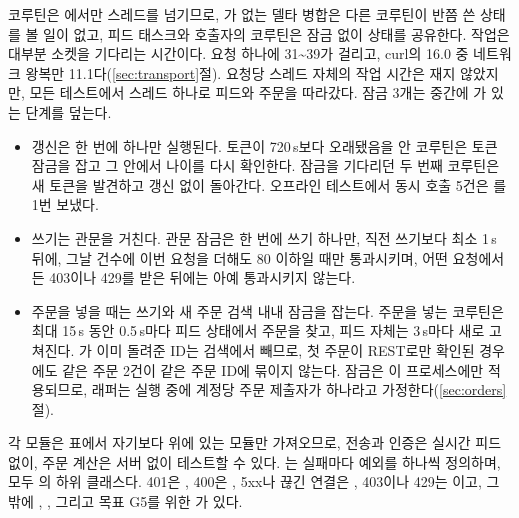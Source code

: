 

 코루틴은 에서만 스레드를 넘기므로, 가 없는 델타 병합은 다른 코루틴이 반쯤 쓴 상태를 볼 일이 없고, 피드 태스크와 호출자의 코루틴은 잠금 없이 상태를 공유한다. 작업은 대부분 소켓을 기다리는 시간이다. 요청 하나에 31\textasciitilde 39\ms{}가 걸리고, curl의 16.0\ms{} 중 네트워크 왕복만 11.1\ms{}다(\ref{sec:transport}절). 요청당 스레드 자체의 작업 시간은 재지 않았지만, 모든 테스트에서 스레드 하나로 피드와 주문을 따라갔다. 잠금 3개는 중간에 가 있는 단계를 덮는다.
\begin{itemize}
\item 갱신은 한 번에 하나만 실행된다. 토큰이 720\,s보다 오래됐음을 안 코루틴은 토큰 잠금을 잡고 그 안에서 나이를 다시 확인한다. 잠금을 기다리던 두 번째 코루틴은 새 토큰을 발견하고 갱신 없이 돌아간다. 오프라인 테스트에서 동시  호출 5건은 를 1번 보냈다.
\item 쓰기는 관문을 거친다. 관문 잠금은 한 번에 쓰기 하나만, 직전 쓰기보다 최소 1\,s 뒤에, 그날 건수에 이번 요청을 더해도 80 이하일 때만 통과시키며, 어떤 요청에서든 403이나 429를 받은 뒤에는 아예 통과시키지 않는다.
\item 주문을 넣을 때는 쓰기와 새 주문 검색 내내 잠금을 잡는다. 주문을 넣는 코루틴은 최대 15\,s 동안 0.5\,s마다 피드 상태에서 주문을 찾고, 피드 자체는 3\,s마다 새로 고쳐진다. 가 이미 돌려준 ID는 검색에서 빼므로, 첫 주문이 REST로만 확인된 경우에도 같은 주문 2건이 같은 주문 ID에 묶이지 않는다. 잠금은 이 프로세스에만 적용되므로, 래퍼는 실행 중에 계정당 주문 제출자가 하나라고 가정한다(\ref{sec:orders}절).
\end{itemize}



 각 모듈은 표에서 자기보다 위에 있는 모듈만 가져오므로, 전송과 인증은 실시간 피드 없이, 주문 계산은 서버 없이 테스트할 수 있다. 는 실패마다 예외를 하나씩 정의하며, 모두 의 하위 클래스다. 401은 , 400은 , 5xx나 끊긴 연결은 , 403이나 429는 이고, 그 밖에 , , 그리고 목표 G5를 위한 가 있다.

